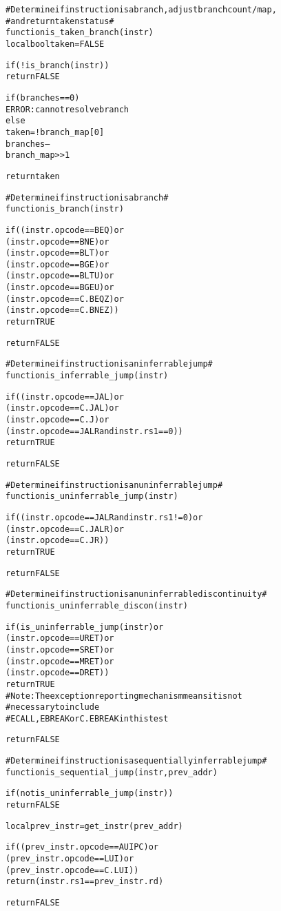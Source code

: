 \pagebreak

\begin{alltt}
# Determine if instruction is a branch, adjust branch count/map,
#   and return taken status #
function is_taken_branch (instr)
  local bool taken = FALSE

  if (!is_branch(instr))
    return FALSE

  if (branches == 0)
    ERROR: cannot resolve branch
  else
    taken = !branch_map[0]
    branches--
    branch_map >> 1

  return taken

# Determine if instruction is a branch #
function is_branch (instr)

  if ((instr.opcode == BEQ)    or
      (instr.opcode == BNE)    or
      (instr.opcode == BLT)    or
      (instr.opcode == BGE)    or
      (instr.opcode == BLTU)   or
      (instr.opcode == BGEU)   or
      (instr.opcode == C.BEQZ) or
      (instr.opcode == C.BNEZ))
    return TRUE

  return FALSE

# Determine if instruction is an inferrable jump #
function is_inferrable_jump (instr)

  if ((instr.opcode == JAL)   or
      (instr.opcode == C.JAL) or
      (instr.opcode == C.J)   or
      (instr.opcode == JALR and instr.rs1 == 0))
    return TRUE

  return FALSE
\end{alltt}

\pagebreak

\begin{alltt}
# Determine if instruction is an uninferrable jump #
function is_uninferrable_jump (instr)

  if ((instr.opcode == JALR and instr.rs1 != 0) or
      (instr.opcode == C.JALR)                  or
      (instr.opcode == C.JR))
    return TRUE

  return FALSE

# Determine if instruction is an uninferrable discontinuity #
function is_uninferrable_discon (instr)

  if (is_uninferrable_jump(instr) or
      (instr.opcode == URET)      or
      (instr.opcode == SRET)      or
      (instr.opcode == MRET)      or
      (instr.opcode == DRET))
    return TRUE
    # Note: The exception reporting mechanism means it is not
    #   necessary to include
    # ECALL, EBREAK or C.EBREAK in this test

  return FALSE

# Determine if instruction is a sequentially inferrable jump #
function is_sequential_jump (instr, prev_addr)

  if (not is_uninferrable_jump(instr))
    return FALSE

  local prev_instr = get_instr(prev_addr)

  if((prev_instr.opcode == AUIPC) or
     (prev_instr.opcode == LUI)   or
     (prev_instr.opcode == C.LUI))
    return (instr.rs1 == prev_instr.rd)

  return FALSE
\end{alltt}

